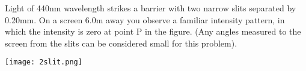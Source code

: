 \documentclass{exam}
\begin{document}
\begin{questions}
\question [20] Light of 440nm wavelength strikes a barrier with two narrow slits separated by 0.20mm. On a screen 6.0m away you observe a familiar intensity pattern, in which the intensity is zero at point P in the figure. (Any angles measured to the screen from the slits can be considered small for this problem).

\texttt{[image: 2slit.png]}


\end{questions}
\end{document}
